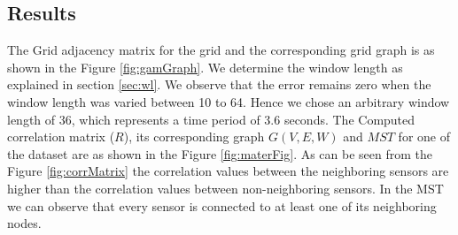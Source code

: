 \subsection{Results}
The Grid adjacency matrix for the grid and the corresponding grid graph is as shown in the Figure \ref{fig:gamGraph}. We determine the window length as explained in section \ref{sec:wl}.  
We observe that the error remains zero when the window length was varied between 10 to 64. Hence we chose an arbitrary window length of 36, which represents a time period of 3.6 seconds. The Computed correlation matrix ($R$), its corresponding graph $G(V,E,W)$ and $MST$ for one of the dataset are as shown in the Figure \ref{fig:materFig}. 
As can be seen from the Figure \ref{fig:corrMatrix} the correlation values between the neighboring sensors are higher than the correlation values between non-neighboring sensors. In the MST we can observe that every sensor is connected to at least one of its neighboring nodes.

